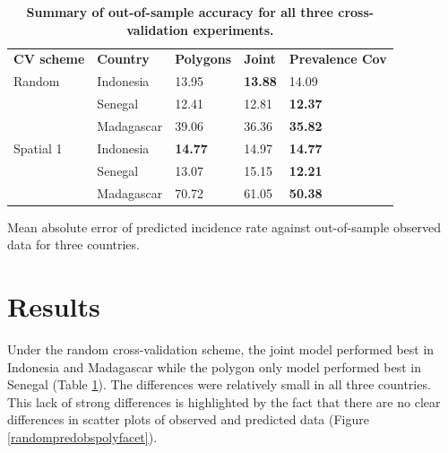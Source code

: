 \documentclass[10pt,letterpaper]{article}
\newlength\savedwidth
\newcommand\thickhline{\noalign{\global\savedwidth\arrayrulewidth\global\arrayrulewidth 2pt}%
\hline
\noalign{\global\arrayrulewidth\savedwidth}}
\begin{document}
\begin{table}[!t]
\begin{adjustwidth}{-2.25in}{0in} %
\centering
\caption{
{\bf Summary of out-of-sample accuracy for all three cross-validation experiments.}}
\begin{tabular}{lllll}
\hline
{\bf CV scheme} & {\bf Country} &  {\bf Polygons} & {\bf Joint} & {\bf Prevalence Cov} \\
\thickhline 
Random & Indonesia  & 13.95 &  {\bf 13.88} & 14.09  \\
& Senegal  & 12.41 &  12.81 &  {\bf 12.37}\\
& Madagascar  & 39.06 &  36.36 &  {\bf 35.82} \vspace{3mm}\\
Spatial 1 & Indonesia & {\bf 14.77} &  14.97 &   {\bf 14.77}\\
& Senegal  & 13.07 &  15.15 &  {\bf 12.21}  \\
& Madagascar  & 70.72 &  61.05 & {\bf 50.38}\vspace{3mm}\\
\end{tabular}
\begin{flushleft}
Mean absolute error of predicted incidence rate against out-of-sample observed data for three countries.
\end{flushleft}
\label{table1}
\end{adjustwidth}
\end{table}





\section*{Results}


Under the random cross-validation scheme, the joint model performed best in Indonesia and Madagascar while the polygon only model performed best in Senegal (Table \ref{table1}).
The differences were relatively small in all three countries.
This lack of strong differences is highlighted by the fact that there are no clear differences in scatter plots of observed and predicted data (Figure \ref{randompredobspolyfacet}).
 
\end{document}
